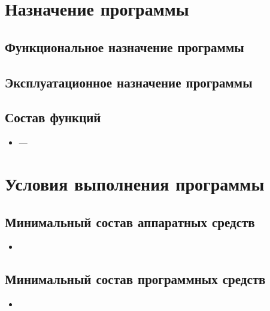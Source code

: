 \documentclass[allcolors=black]{article}
\begin{document}
\makeTitlePage

\tableofcontents

\section{Назначение программы}
\subsection{Функциональное назначение программы}

\subsection{Эксплуатационное назначение программы}

\subsection{Состав функций}
\begin{itemize}
    \item \textit{} --- 
\end{itemize}

\section{Условия выполнения программы}
\subsection{Минимальный состав аппаратных средств}
\begin{itemize}
    \item {}
\end{itemize}

\subsection{Минимальный состав программных средств}
\begin{itemize}
    \item {}
\end{itemize}
\end{document}
